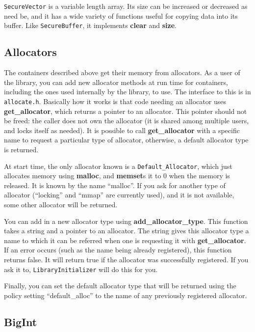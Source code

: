 \documentclass{article}
\newcommand{\filename}[1]{\texttt{#1}}
\newcommand{\function}[1]{\textbf{#1}}
\newcommand{\type}[1]{\texttt{#1}}
\begin{document}
\type{SecureVector} is a variable length array. Its size can be increased or
decreased as need be, and it has a wide variety of functions useful for copying
data into its buffer. Like \type{SecureBuffer}, it implements \function{clear}
and \function{size}.

\subsection{Allocators}

The containers described above get their memory from allocators. As a user of
the library, you can add new allocator methods at run time for containers,
including the ones used internally by the library, to use. The interface to
this is in \filename{allocate.h}. Basically how it works is that code needing
an allocator uses \function{get\_allocator}, which returns a pointer to an
allocator. This pointer should not be freed: the caller does not own the
allocator (it is shared among multiple users, and locks itself as needed). It
is possible to call \function{get\_allocator} with a specific name to request a
particular type of allocator, otherwise, a default allocator type is returned.

At start time, the only allocator known is a \type{Default\_Allocator}, which
just allocates memory using \function{malloc}, and \function{memset}s it to 0
when the memory is released. It is known by the name ``malloc''. If you ask for
another type of allocator (``locking'' and ``mmap'' are currently used), and it
is not available, some other allocator will be returned.

You can add in a new allocator type using \function{add\_allocator\_type}. This
function takes a string and a pointer to an allocator. The string gives this
allocator type a name to which it can be referred when one is requesting it
with \function{get\_allocator}. If an error occurs (such as the name being
already registered), this function returns false. It will return true if the
allocator was successfully registered. If you ask it to,
\type{LibraryInitializer} will do this for you.

Finally, you can set the default allocator type that will be returned using
the policy setting ``default\_alloc'' to the name of any previously registered
allocator.

\subsection{BigInt}
\end{document}
